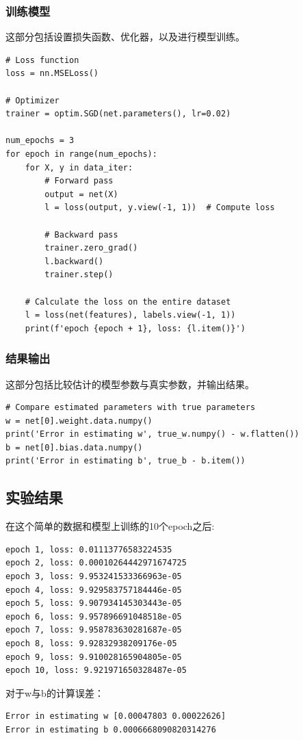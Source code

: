 \documentclass[a4paper,12pt]{article}
\begin{document}
\subsubsection{训练模型}
这部分包括设置损失函数、优化器，以及进行模型训练。
\begin{lstlisting}
# Loss function
loss = nn.MSELoss()

# Optimizer
trainer = optim.SGD(net.parameters(), lr=0.02)

num_epochs = 3
for epoch in range(num_epochs):
    for X, y in data_iter:
        # Forward pass
        output = net(X)
        l = loss(output, y.view(-1, 1))  # Compute loss

        # Backward pass
        trainer.zero_grad()
        l.backward()
        trainer.step()

    # Calculate the loss on the entire dataset
    l = loss(net(features), labels.view(-1, 1))
    print(f'epoch {epoch + 1}, loss: {l.item()}')
\end{lstlisting}

\subsubsection{结果输出}
这部分包括比较估计的模型参数与真实参数，并输出结果。
\begin{lstlisting}
# Compare estimated parameters with true parameters
w = net[0].weight.data.numpy()
print('Error in estimating w', true_w.numpy() - w.flatten())
b = net[0].bias.data.numpy()
print('Error in estimating b', true_b - b.item())
\end{lstlisting}

\subsection{实验结果}
在这个简单的数据和模型上训练的10个epoch之后:
\begin{lstlisting}
epoch 1, loss: 0.01113776583224535
epoch 2, loss: 0.00010264442971674725
epoch 3, loss: 9.953241533366963e-05
epoch 4, loss: 9.929583757184446e-05
epoch 5, loss: 9.907934145303443e-05
epoch 6, loss: 9.957896691048518e-05
epoch 7, loss: 9.958783630281687e-05
epoch 8, loss: 9.92832938209176e-05
epoch 9, loss: 9.910028165904805e-05
epoch 10, loss: 9.921971650328487e-05
\end{lstlisting}

对于w与b的计算误差：
\begin{lstlisting}
Error in estimating w [0.00047803 0.00022626]
Error in estimating b 0.0006668090820314276
\end{lstlisting}
\end{document}

